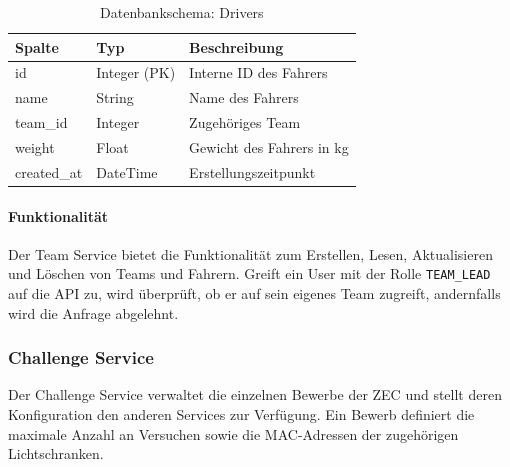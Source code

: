 \begin{table}[h]
    \centering
    \begin{tabular}{|l|l|l|}
        \hline
        \textbf{Spalte} & \textbf{Typ} & \textbf{Beschreibung} \\
        \hline
        id & Integer (PK) & Interne ID des Fahrers \\
        name & String & Name des Fahrers \\
        team\_id & Integer & Zugehöriges Team \\
        weight & Float & Gewicht des Fahrers in kg \\
        created\_at & DateTime & Erstellungszeitpunkt \\
        \hline
    \end{tabular}
    \caption{Datenbankschema: Drivers}
    \label{tab:driver_schema}
\end{table}

\paragraph{Funktionalität}
Der Team Service bietet die Funktionalität zum Erstellen, Lesen, 
Aktualisieren und Löschen von Teams und Fahrern. Greift ein User mit der
Rolle \texttt{TEAM\_LEAD} auf die \gls{API} zu, wird überprüft, ob er auf sein eigenes Team zugreift, 
andernfalls wird die Anfrage abgelehnt.

\newpage

\subsubsection{Challenge Service}
\label{sec:challenge_service}

Der Challenge Service verwaltet die einzelnen Bewerbe der \gls{ZEC} und stellt deren Konfiguration 
den anderen Services zur Verfügung. Ein Bewerb definiert die maximale Anzahl an Versuchen 
sowie die MAC-Adressen der zugehörigen Lichtschranken.

